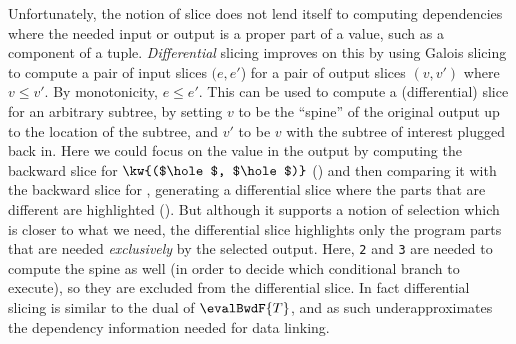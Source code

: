 Unfortunately, the notion of slice does not lend itself to computing dependencies where the needed input or output is a proper part of a value, such as a component of a tuple. \emph{Differential} slicing \cite{perera12a} improves on this by using Galois slicing to compute a pair of input slices $(e,e'$) for a pair of output slices $(v,v')$ where $v \leq v'$. By monotonicity, $e \leq e'$. This can be used to compute a (differential) slice for an arbitrary subtree, by setting $v$ to be the ``spine'' of the original output up to the location of the subtree, and $v'$ to be $v$ with the subtree of interest plugged back in. Here we could focus on the value  in the output by computing the backward slice for $\kw{($\hole$, $\hole$)}$ () and then comparing it with the backward slice for , generating a differential slice where the parts that are different are highlighted (). But although it supports a notion of selection which is closer to what we need, the differential slice highlights only the program parts that are needed \emph{exclusively} by the selected output. Here, \lstinline{2} and \lstinline{3} are needed to compute the spine as well (in order to decide which conditional branch to execute), so they are excluded from the differential slice. In fact differential slicing is similar to the dual of $\evalBwdF{T}$, and as such underapproximates the dependency information needed for data linking.
